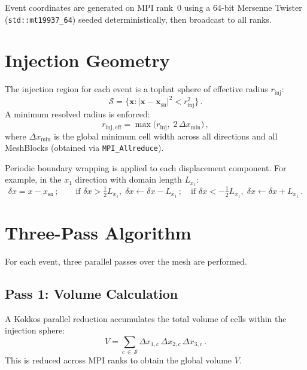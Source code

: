 \documentclass[11pt]{article}
\begin{document}
Event coordinates are generated on MPI rank~0 using a 64-bit Mersenne Twister
(\texttt{std::mt19937\_64}) seeded deterministically, then broadcast to all
ranks.

\section{Injection Geometry}

The injection region for each event is a tophat sphere of effective radius
$r_\mathrm{inj}$:
\begin{equation}
  \mathcal{S} = \bigl\{ \mathbf{x} : |\mathbf{x} - \mathbf{x}_\mathrm{sn}|^2 < r_\mathrm{inj}^2 \bigr\}\,.
\end{equation}
A minimum resolved radius is enforced:
\begin{equation}
  r_\mathrm{inj,eff} = \max\!\bigl(r_\mathrm{inj},\; 2\,\Delta x_\mathrm{min}\bigr)\,,
\end{equation}
where $\Delta x_\mathrm{min}$ is the global minimum cell width across all
directions and all MeshBlocks (obtained via \texttt{MPI\_Allreduce}).

Periodic boundary wrapping is applied to each displacement component.  For
example, in the $x_1$ direction with domain length $L_{x_1}$:
\begin{equation}
  \delta x = x - x_\mathrm{sn}\,; \qquad
  \text{if } \delta x > \tfrac{1}{2}L_{x_1},\; \delta x \leftarrow \delta x - L_{x_1}\,; \quad
  \text{if } \delta x < -\tfrac{1}{2}L_{x_1},\; \delta x \leftarrow \delta x + L_{x_1}\,.
\end{equation}

\section{Three-Pass Algorithm}

For each event, three parallel passes over the mesh are performed.

\subsection{Pass 1: Volume Calculation}

A Kokkos parallel reduction accumulates the total volume of cells within the
injection sphere:
\begin{equation}
  V = \sum_{c \,\in\, \mathcal{S}} \Delta x_{1,c}\,\Delta x_{2,c}\,\Delta x_{3,c}\,.
\end{equation}
This is reduced across MPI ranks to obtain the global volume $V$.
\end{document}
